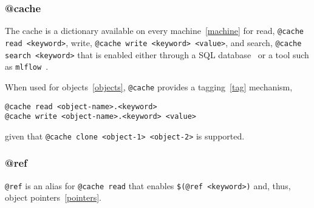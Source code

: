 \subsubsection{@cache}
\label{cache}

The cache is a dictionary available on every machine~\ref{machine} for read, \texttt{@cache read <keyword>}, write, \texttt{@cache write <keyword> <value>}, and search, \texttt{@cache search <keyword>} that is enabled either through a SQL database~ or a tool such as \texttt{mlflow}~.

When used for objects~\ref{objects}, \texttt{@cache} provides a tagging~\ref{tag} mechanism,
%
\begin{verbatim}
@cache read <object-name>.<keyword>
@cache write <object-name>.<keyword> <value>
\end{verbatim}
%
given that \texttt{@cache clone <object-1> <object-2>} is supported. 

\subsubsection{@ref}
\label{ref}

\texttt{@ref} is an alias for \texttt{@cache read} that enables \texttt{\$(@ref <keyword>)} and, thus, object pointers~\ref{pointers}.
